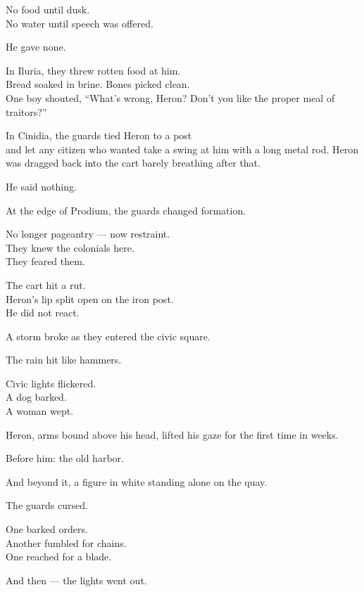 \documentclass[12pt]{article}
\begin{document}
No food until dusk.\\
No water until speech was offered.

He gave none.

\vspace{1em}

In Iluria, they threw rotten food at him.\\
Bread soaked in brine. Bones picked clean.\\
One boy shouted, “What’s wrong, Heron? Don’t you like the proper meal of traitors?”

In Cinidia, the guards tied Heron to a post\\
and let any citizen who wanted take a swing at him with a long metal rod. Heron was dragged back into the cart barely breathing after that.

He said nothing.

\vspace{1em}

At the edge of Prodium, the guards changed formation.

No longer pageantry — now restraint.\\
They knew the colonials here.\\
They feared them.

The cart hit a rut.\\
Heron’s lip split open on the iron post.\\
He did not react.

\vspace{1em}

A storm broke as they entered the civic square.

The rain hit like hammers.

Civic lights flickered.\\
A dog barked.\\
A woman wept.

Heron, arms bound above his head, lifted his gaze for the first time in weeks.

Before him: the old harbor.

And beyond it, a figure in white standing alone on the quay.

\vspace{1em}

The guards cursed.

One barked orders.\\
Another fumbled for chains.\\
One reached for a blade.

And then — the lights went out.
\end{document}
